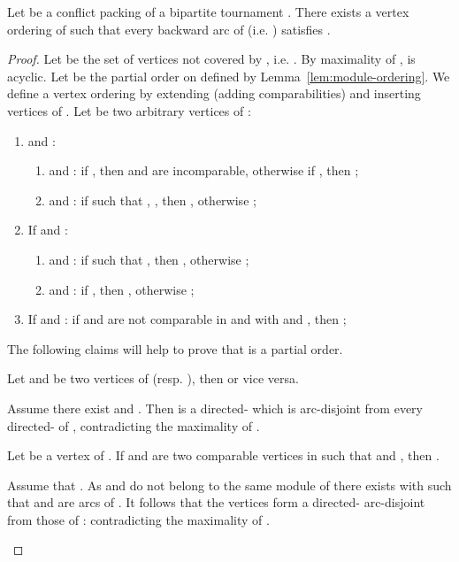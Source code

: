 \begin{lemma} \label{lem:cpfasbt}
Let  be a conflict packing of a bipartite tournament . There exists a vertex ordering  of  such that every backward arc  of  (i.e. ) satisfies . 
\end{lemma}
\begin{proof}
Let  be the set of vertices not covered by , i.e. . By maximality of ,  is acyclic. Let  be the partial order on  defined by Lemma~\ref{lem:module-ordering}. We define a vertex ordering  by extending  (adding comparabilities) and inserting vertices of .
Let  be two arbitrary vertices of :

\begin{enumerate}
\item  and :
\begin{enumerate}
\item  and : if , then  and  are incomparable, otherwise if , then ; 
\item   and : if   such that , , then , otherwise ;
\end{enumerate}

\item If  and : 
\begin{enumerate}
\item  and : 
if  such that , then , otherwise ;
\item   and : if , then , otherwise ;
\end{enumerate}

\item If  and : if  and  are not comparable in  and  with  and , then ;
\end{enumerate}

The following claims will help to prove that  is a partial order.
 
\begin{claim} \label{cl:comp}
Let  and  be two vertices of  (resp. ), then  or vice versa.
\end{claim}
\begin{proofclaim}
Assume there exist  and . Then  is a directed- which is arc-disjoint from every directed- of , contradicting the maximality of .
\end{proofclaim}

\begin{claim} \label{cl:consec}
Let  be a vertex of . If  and  are two comparable vertices in  such that  and , then .
\end{claim}
\begin{proofclaim}
Assume that . As  and  do not belong to the same module of  there exists  with  such that  and  are arcs of . It follows that the vertices  form a directed- arc-disjoint from those of : contradicting the maximality of .
\end{proofclaim}


\end{proof}
